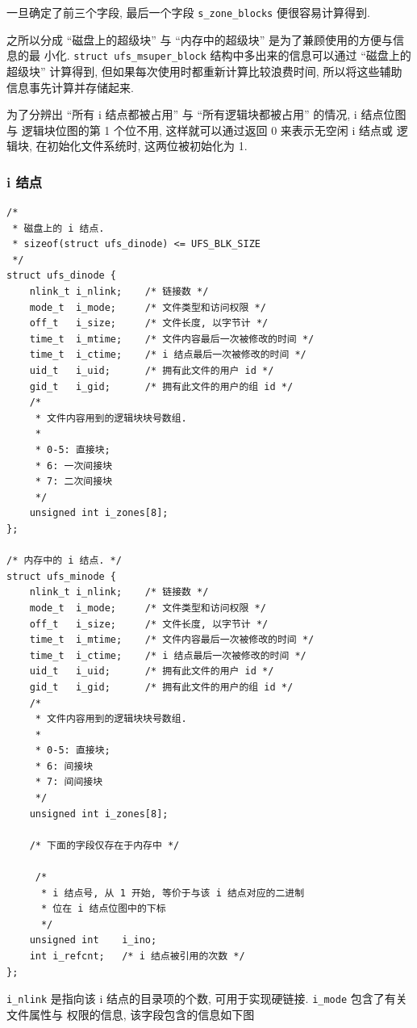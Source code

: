 \documentclass[nofonts]{ctexart}
\begin{document}
一旦确定了前三个字段, 最后一个字段 \texttt{s\_zone\_blocks}
便很容易计算得到.

之所以分成 ``磁盘上的超级块'' 与 ``内存中的超级块''
是为了兼顾使用的方便与信息的最 小化. \texttt{struct ufs\_msuper\_block}
结构中多出来的信息可以通过 ``磁盘上的超级块'' 计算得到,
但如果每次使用时都重新计算比较浪费时间,
所以将这些辅助信息事先计算并存储起来.

为了分辨出 ``所有 i 结点都被占用'' 与 ``所有逻辑块都被占用'' 的情况, i
结点位图与 逻辑块位图的第 1 个位不用, 这样就可以通过返回 0 来表示无空闲
i 结点或 逻辑块, 在初始化文件系统时, 这两位被初始化为 1.

\subsubsection{i 结点}\label{i-ux7ed3ux70b9}

\begin{verbatim}
/*
 * 磁盘上的 i 结点.
 * sizeof(struct ufs_dinode) <= UFS_BLK_SIZE
 */
struct ufs_dinode {
    nlink_t i_nlink;    /* 链接数 */
    mode_t  i_mode;     /* 文件类型和访问权限 */
    off_t   i_size;     /* 文件长度, 以字节计 */
    time_t  i_mtime;    /* 文件内容最后一次被修改的时间 */
    time_t  i_ctime;    /* i 结点最后一次被修改的时间 */
    uid_t   i_uid;      /* 拥有此文件的用户 id */
    gid_t   i_gid;      /* 拥有此文件的用户的组 id */
    /*
     * 文件内容用到的逻辑块块号数组.
     *
     * 0-5: 直接块;
     * 6: 一次间接块
     * 7: 二次间接块
     */
    unsigned int i_zones[8];
};

/* 内存中的 i 结点. */
struct ufs_minode {
    nlink_t i_nlink;    /* 链接数 */
    mode_t  i_mode;     /* 文件类型和访问权限 */
    off_t   i_size;     /* 文件长度, 以字节计 */
    time_t  i_mtime;    /* 文件内容最后一次被修改的时间 */
    time_t  i_ctime;    /* i 结点最后一次被修改的时间 */
    uid_t   i_uid;      /* 拥有此文件的用户 id */
    gid_t   i_gid;      /* 拥有此文件的用户的组 id */
    /*
     * 文件内容用到的逻辑块块号数组.
     *
     * 0-5: 直接块;
     * 6: 间接块
     * 7: 间间接块
     */
    unsigned int i_zones[8];

    /* 下面的字段仅存在于内存中 */

     /*
      * i 结点号, 从 1 开始, 等价于与该 i 结点对应的二进制
      * 位在 i 结点位图中的下标
      */
    unsigned int    i_ino;    
    int i_refcnt;   /* i 结点被引用的次数 */
};
\end{verbatim}

\texttt{i\_nlink} 是指向该 i 结点的目录项的个数, 可用于实现硬链接.
\texttt{i\_mode} 包含了有关文件属性与 权限的信息, 该字段包含的信息如下图
\end{document}
